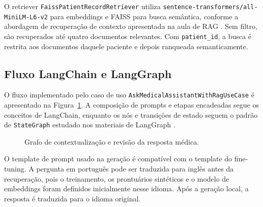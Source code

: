 \documentclass[12pt,a4paper]{article}
\begin{document}
O retriever \texttt{FaissPatientRecordRetriever} utiliza \texttt{sentence-transformers/all-MiniLM-L6-v2} para embeddings e FAISS para busca semântica, conforme a abordagem de recuperação de contexto apresentada na aula de RAG \cite{aula3,faiss}. Sem filtro, são recuperados até quatro documentos relevantes. Com \texttt{patient\_id}, a busca é restrita aos documentos daquele paciente e depois ranqueada semanticamente.

\subsection{Fluxo LangChain e LangGraph}

O fluxo implementado pelo caso de uso \texttt{AskMedicalAssistantWithRagUseCase} é apresentado na Figura~\ref{fig:langgraph}. A composição de prompts e etapas encadeadas segue os conceitos de LangChain, enquanto os nós e transições de estado seguem o padrão de \texttt{StateGraph} estudado nos materiais de LangGraph \cite{langchain,langgraph}.

\begin{figure}[ht]
\centering
{}
\caption{Grafo de contextualização e revisão da resposta médica.}
\label{fig:langgraph}
\end{figure}

O template de prompt usado na geração é compatível com o template do fine-tuning. A pergunta em português pode ser traduzida para inglês antes da recuperação, pois o treinamento, os prontuários sintéticos e o modelo de embeddings foram definidos inicialmente nesse idioma. Após a geração local, a resposta é traduzida para o idioma original.
\end{document}
